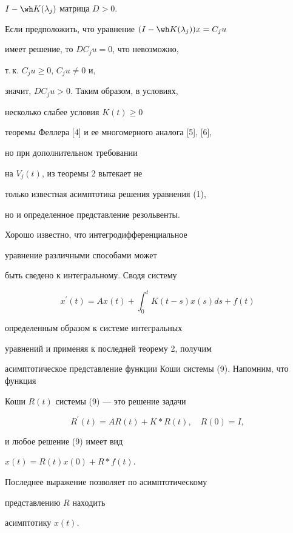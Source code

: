 $I-\wh K(\lambda_j)$ матрица $D>0$.


Если предположить, что уравнение $(I-\wh K(\lambda_j))x=C_ju$


имеет решение, то $DC_ju=0$, что невозможно,


т.\,к. $C_ju\geq 0$, $C_ju\neq 0$ и,


значит, $DC_ju>0$. Таким образом, в условиях, 


несколько слабее условия $K(t)\geq 0$


теоремы Феллера [4] и ее многомерного аналога [5], [6],


но при дополнительном требовании


на $V_j(t)$, из теоремы 2 вытекает не 


только известная асимптотика решения уравнения (1),


но и определенное представление резольвенты.





Хорошо известно, что интегродифференциальное 


уравнение различными способами может


быть сведено к интегральному. Сводя систему


\begin{equation}


x^{\prime} (t)=Ax(t)+\int_0^t K(t-s)x(s)ds+f(t)


\end{equation}


определенным образом к системе интегральных 


уравнений и применяя к последней теорему 2, получим


асимптотическое представление функции Коши системы (9). Напомним, что функция


Коши $R(t)$ системы (9) --- это решение задачи


\begin{equation}


R^{\prime}(t)=AR(t)+K*R(t),\quad R(0)=I,


\end{equation}


и любое решение (9) имеет вид


$x(t)=R(t)x(0)+R*f(t)$.


Последнее выражение позволяет по асимптотическому 


представлению $R$ находить


асимптотику $x(t)$.






